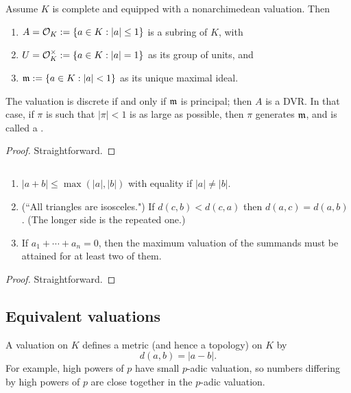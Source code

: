 \begin{pr}
Assume $K$ is complete and equipped with a nonarchimedean valuation. Then
\begin{enumerate}
\item
$A=\mathcal{O}_K:=\left\{{a\in K}:{|a|\le1}\right\}$ is a subring of $K$, with 
\item
$U=\mathcal{O}_K^{\times}:=\left\{{a\in K}:{|a|=1}\right\}$ as its group of units, and
\item
$\mathfrak{m}:=\left\{{a\in K}:{|a|<1}\right\}$ as its unique maximal ideal.
\end{enumerate}
The valuation is discrete if and only if $\mathfrak{m}$ is principal; then $A$ is a DVR. In that case, if $\pi$ is such that $|\pi|<1$ is as large as possible, then $\pi$ generates $\mathfrak{m}$, and is called a .
\end{pr}
\begin{proof}
Straightforward.
\end{proof}

\begin{pr}
$\,$
\begin{enumerate}
\item
$|a+b|\le \max(|a|,|b|)$ with equality if $|a|\ne |b|$.
\item (``All triangles are isosceles.") If $d(c,b)<d(c,a)$ then $d(a,c)=d(a,b)$. (The longer side is the repeated one.)
\item If $a_1+\cdots +a_n=0$, then the maximum valuation of the summands must be attained for at least two of them.
\end{enumerate}
\end{pr}
\begin{proof}
Straightforward.
\end{proof}
\subsection{Equivalent valuations}
A valuation on $K$ defines a metric (and hence a topology) on $K$ by
\[
d(a,b)=|a-b|.
\]
For example, high powers of $p$ have small $p$-adic valuation, so numbers differing by high powers of $p$ are close together in the $p$-adic valuation.

